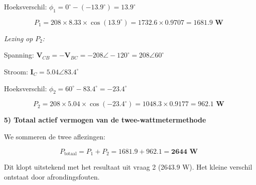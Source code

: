 \documentclass[a4paper,11pt]{article}
\begin{document}
\begin{oefenblok}[title=Oefening: Onevenwichtige Delta-belasting met twee-wattmetermethode]
Hoeksverschil: $\phi_1 = 0^\circ - (-13.9^\circ) = 13.9^\circ$

$$P_1 = 208 \times 8.33 \times \cos(13.9^\circ) = 1732.6 \times 0.9707 = \boxed{\mathbf{1681.9\text{ W}}}$$

\textit{Lezing op $P_2$:}

Spanning: $\mathbf{V}_{CB} = -\mathbf{V}_{BC} = -208 \angle -120^\circ = 208 \angle 60^\circ$

Stroom: $\mathbf{I}_C = 5.04 \angle 83.4^\circ$

Hoeksverschil: $\phi_2 = 60^\circ - 83.4^\circ = -23.4^\circ$

$$P_2 = 208 \times 5.04 \times \cos(-23.4^\circ) = 1048.3 \times 0.9177 = \boxed{\mathbf{962.1\text{ W}}}$$

\noindent\textbf{5) Totaal actief vermogen van de twee-wattmetermethode}

We sommeren de twee aflezingen:

$$P_{\text{totaal}} = P_1 + P_2 = 1681.9 + 962.1 = \boxed{\mathbf{2644\text{ W}}}$$

Dit klopt uitstekend met het resultaat uit vraag 2 (2643.9 W). Het kleine verschil ontstaat door afrondingsfouten.

\end{oefenblok}
\end{document}
